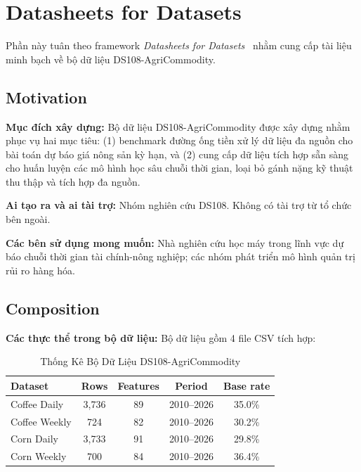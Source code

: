 
\section{Datasheets for Datasets}
\label{sec:datasheets}

Phần này tuân theo framework \textit{Datasheets for Datasets}~\cite{gebru2021datasheets}
nhằm cung cấp tài liệu minh bạch về bộ dữ liệu DS108-AgriCommodity.

\subsection{Motivation}

\textbf{Mục đích xây dựng:}
Bộ dữ liệu DS108-AgriCommodity được xây dựng nhằm phục vụ hai mục tiêu: (1) benchmark
đường ống tiền xử lý dữ liệu đa nguồn cho bài toán dự báo giá nông sản kỳ hạn,
và (2) cung cấp dữ liệu tích hợp sẵn sàng cho huấn luyện các mô hình học sâu chuỗi
thời gian, loại bỏ gánh nặng kỹ thuật thu thập và tích hợp đa nguồn.

\textbf{Ai tạo ra và ai tài trợ:}
Nhóm nghiên cứu DS108. Không có tài trợ từ tổ chức bên ngoài.

\textbf{Các bên sử dụng mong muốn:}
Nhà nghiên cứu học máy trong lĩnh vực dự báo chuỗi thời gian tài chính-nông nghiệp;
các nhóm phát triển mô hình quản trị rủi ro hàng hóa.

\subsection{Composition}

\textbf{Các thực thể trong bộ dữ liệu:}
Bộ dữ liệu gồm 4 file CSV tích hợp:

\begin{table}[htbp]
\caption{Thống Kê Bộ Dữ Liệu DS108-AgriCommodity}
\label{tab:dataset_stats}
\centering
\begin{tabular}{@{}lcccc@{}}
\toprule
\textbf{Dataset} & \textbf{Rows} & \textbf{Features} & \textbf{Period} & \textbf{Base rate} \\
\midrule
Coffee Daily   & 3,736 & 89  & 2010--2026 & 35.0\% \\
Coffee Weekly  & 724   & 82  & 2010--2026 & 30.2\% \\
Corn Daily     & 3,733 & 91  & 2010--2026 & 29.8\% \\
Corn Weekly    & 700   & 84  & 2010--2026 & 36.4\% \\
\bottomrule
\end{tabular}
\end{table}

